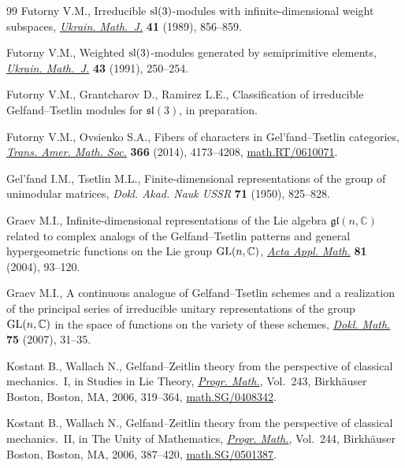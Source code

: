 \documentclass[pdftex]{sigma}
\numberwithin{equation}{section}
\begin{document}
\begin{thebibliography}{99}
Futorny V.M., Irreducible {${\rm sl}(3)$}-modules with inf\/inite-dimensional
  weight subspaces, \href{http://dx.doi.org/10.1007/BF01060713}{\textit{Ukrain. Math.~J.}} \textbf{41} (1989), 856--859.

Futorny V.M., Weighted {${\rm sl}(3)$}-modules generated by semiprimitive
  elements, \href{http://dx.doi.org/10.1007/BF01060517}{\textit{Ukrain. Math.~J.}} \textbf{43} (1991), 250--254.

Futorny V.M., Grantcharov D., Ramirez L.E., Classif\/ication of irreducible
  Gelfand--Tsetlin modules for $\mathfrak{sl}(3)$, {i}n preparation.

Futorny V.M., Ovsienko S.A., Fibers of characters in {G}el'fand--{T}setlin
  categories, \href{http://dx.doi.org/10.1090/S0002-9947-2014-05938-2}{\textit{Trans. Amer. Math. Soc.}} \textbf{366} (2014), 4173--4208,
  \href{http://arxiv.org/abs/math.RT/0610071}{math.RT/0610071}.

Gel'fand I.M., Tsetlin M.L., Finite-dimensional representations of the group of
  unimodular matrices, \textit{Dokl. Akad. Nauk USSR} \textbf{71} (1950),
  825--828.

Graev M.I., Inf\/inite-dimensional representations of the {L}ie algebra
  {${\mathfrak{gl}}(n,{\mathbb C})$} related to complex analogs of the
  {G}elfand--{T}setlin patterns and general hypergeometric functions on the
  {L}ie group {${\rm GL}(n,{\mathbb C})$}, \href{http://dx.doi.org/10.1023/B:ACAP.0000024196.16709.f6}{\textit{Acta Appl. Math.}} \textbf{81}
  (2004), 93--120.

Graev M.I., A continuous analogue of Gelfand--Tsetlin schemes and a realization
  of the principal series of irreducible unitary representations of the group
  {${\rm GL}(n,{\mathbb C})$} in the space of functions on the variety of these
  schemes, \href{http://dx.doi.org/10.1134/S1064562407010103}{\textit{Dokl. Math.}} \textbf{75} (2007), 31--35.

Kostant B., Wallach N., Gelfand--{Z}eitlin theory from the perspective of
  classical mechanics.~{I}, in Studies in {L}ie Theory, \href{http://dx.doi.org/10.1007/0-8176-4478-4_12}{\textit{Progr. Math.}},
  Vol.~243, Birkh\"auser Boston, Boston, MA, 2006, 319--364,
  \href{http://arxiv.org/abs/math.SG/0408342}{math.SG/0408342}.

Kostant B., Wallach N., Gelfand--{Z}eitlin theory from the perspective of
  classical mechanics.~{II}, in The Unity of Mathematics, \href{http://dx.doi.org/10.1007/0-8176-4467-9_10}{\textit{Progr.
  Math.}}, Vol.~244, Birkh\"auser Boston, Boston, MA, 2006, 387--420,
  \href{http://arxiv.org/abs/math.SG/0501387}{math.SG/0501387}.


\end{thebibliography}
\end{document}

